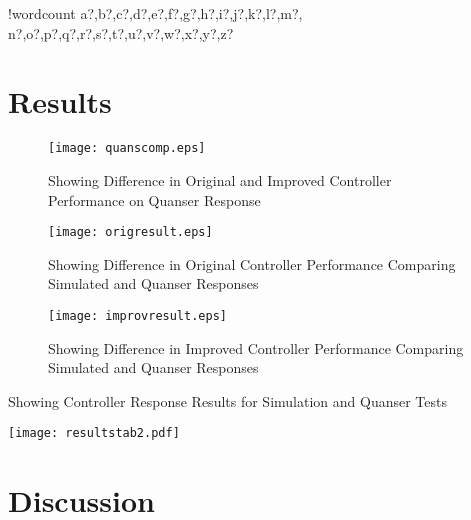 \documentclass[11pt]{article}
\newcounter{words}
\newenvironment{counted}{%
  \setcounter{words}{0}
  \SearchList!{wordcount}{\stepcounter{words}}
    {a?,b?,c?,d?,e?,f?,g?,h?,i?,j?,k?,l?,m?,
    n?,o?,p?,q?,r?,s?,t?,u?,v?,w?,x?,y?,z?}
  \UndoBoundary{'}
  \SearchOrder{p;}}{%
  \StopSearching}
\begin{document}
\begin{counted}
\section{Results}\label{results}

\begin{figure}[H]
 \centering
 \texttt{[image: quanscomp.eps]}
\caption{Showing Difference in Original and Improved Controller Performance on Quanser Response}
 \label{quanscomp}
 \end{figure}

\begin{figure}[H]
\centering
\begin{minipage}{.49\textwidth}
\centering
\texttt{[image: origresult.eps]}
\caption{Showing Difference in Original Controller Performance Comparing Simulated and Quanser Responses}
\label{origresult}
\end{minipage}
\hfill
\begin{minipage}{.49\textwidth}
\centering
\texttt{[image: improvresult.eps]}
\caption{Showing Difference in Improved Controller Performance Comparing Simulated and Quanser Responses}
\label{improvresult}
\end{minipage}
\vspace{-20pt}
\end{figure}

\begin{table}[H]
 \centering
 \caption{Showing Controller Response Results for Simulation and Quanser Tests}
 \texttt{[image: resultstab2.pdf]}
 \label{resultstab}
 \end{table}

\section{Discussion}\label{discussion}


\end{counted}
\end{document}
